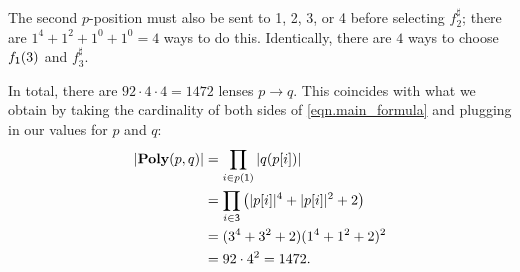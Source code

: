 \documentclass[Book-Poly]{subfiles}
\begin{document}
\begin{example}
  The second $p$-position must also be sent to 1, 2, 3, or 4 before selecting $f^\sharp_2$; there are $1^4+1^2+1^0+1^0=4$ ways to do this.
  Identically, there are $4$ ways to choose $f_{\textsf{1}}(3)$ and $f^\sharp_3$.

  In total, there are $92 \cdot 4 \cdot 4=1472$ lenses $p\to q$.
  This coincides with what we obtain by taking the cardinality of both sides of \eqref{eqn.main_formula} and plugging in our values for $p$ and $q$:
  \begin{align*}
    |\mathbf{Poly}(p, q)| &= \prod_{i \in p(\textsf{1})} |q(p[i])| \\
    &= \prod_{i\in\textsf{3}}\left(|p[i]|^4 + |p[i]|^2 + 2\right) \\
    &= (3^4 + 3^2 + 2)(1^4 + 1^2 + 2)^2 \\
    &= 92 \cdot 4^2 = 1472.
  \end{align*}
\end{example}
\end{document}
